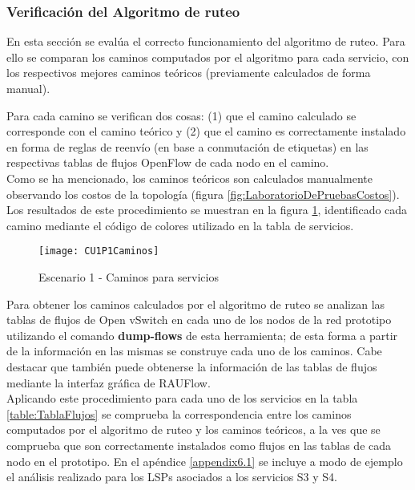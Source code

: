

\subsubsection{Verificaci\'on del Algoritmo de ruteo}
En esta secci\'on se eval\'ua el correcto funcionamiento del algoritmo de ruteo. Para ello se comparan los caminos computados por el algoritmo para cada servicio, con los respectivos mejores caminos te\'oricos (previamente calculados de forma manual). 

Para cada camino se verifican dos cosas: (1) que el camino calculado se corresponde con el camino te\'orico y (2) que el camino es correctamente instalado en forma de reglas de reenvío (en base a conmutaci\'on de etiquetas) en las respectivas tablas de flujos OpenFlow de cada nodo en el camino.\\

Como se ha mencionado, los caminos te\'oricos son calculados manualmente observando los costos de la topolog\'ia (figura \ref{fig:LaboratorioDePruebasCostos}). Los resultados de este procedimiento se muestran en la figura \ref{fig:CUP1Caminos}, identificado cada camino mediante el código de colores utilizado en la tabla de servicios.\\

\begin{figure}[ht!] 
\centering    
\texttt{[image: CU1P1Caminos]}
\caption[Escenario 1 - Caminos para servicios]{Escenario 1 - Caminos para servicios}
\label{fig:CUP1Caminos}
\end{figure}

Para obtener los caminos calculados por el algoritmo de ruteo se analizan las tablas de flujos de Open vSwitch en cada uno de los nodos de la red prototipo utilizando el comando \textbf{dump-flows} de esta herramienta; de esta forma a partir de la informaci\'on en las mismas se construye cada uno de los caminos. Cabe destacar que tambi\'en puede obtenerse la informaci\'on de las tablas de flujos mediante la interfaz gráfica de RAUFlow.\\

Aplicando este procedimiento para cada uno de los servicios en la tabla \ref{table:TablaFlujos} se comprueba la correspondencia entre los caminos computados por el algoritmo de ruteo y los caminos te\'oricos, a la ves que se comprueba que son correctamente instalados como flujos en las tablas de cada nodo en el prototipo. En el apéndice \ref{appendix6.1} se incluye a modo de ejemplo el análisis realizado para los LSPs asociados a los servicios S3 y S4.\\ 
 
